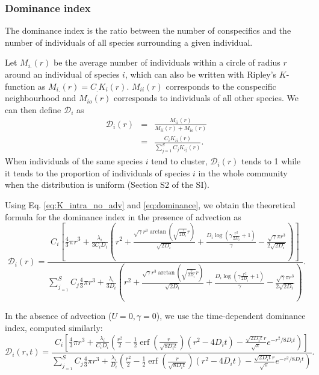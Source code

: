 \documentclass[english]{article}
\DeclareMathOperator\erf{erf}
\begin{document}
\subsubsection*{Dominance index}

The dominance index \citep[defined in Table S1 in the Supporting Information of][]{wiegand_how_2007}
is the ratio between the number of conspecifics and the number of
individuals of all species surrounding a given individual.

 Let $M_{i.}(r)$ be the average number of individuals within a circle
of radius $r$ around an individual of species $i$, which can also
be written with Ripley's $K$-function as $M_{i.}(r)=C_{.}K_{i}(r)$.
$M_{ii}(r)$ corresponds to the conspecific neighbourhood and $M_{io}(r)$
corresponds to individuals of all other species. We can then define
$\mathcal{D}_{i}$ as
\begin{equation}
\begin{array}{ccc}
\mathcal{D}_{i}(r) & = & \frac{M_{ii}(r)}{M_{ii}(r)+M_{io}(r)}\\
 & = & \frac{C_{i}K_{ii}(r)}{\sum_{j=1}^{S}C_{j}K_{ij}(r)}.
\end{array}\label{eq:dominance}
\end{equation}
When individuals of the same species $i$ tend to cluster, $\mathcal{D}_{i}(r)$
tends to 1 while it tends to the proportion of individuals of species
$i$ in the whole community when the distribution is uniform (Section
S2 of the SI).

Using Eq. \ref{eq:K_intra_no_adv} and \ref{eq:dominance}, we obtain
the theoretical formula for the dominance index in the presence of
advection as
\begin{equation}
\mathcal{D}_{i}(r)=\frac{C_{i}\left[\frac{4}{3}\pi r^{3}+\frac{\lambda_i}{3C_{i}D_i}\left(r^{2}+\frac{\sqrt{\gamma}r^{3}\arctan(\sqrt{\frac{\gamma}{2D_i}}r)}{\sqrt{2D_i}}+\frac{D_i\log\left(\gamma\frac{r^{2}}{2D_i}+1\right)}{\gamma}-\frac{\sqrt{\gamma}\pi r^{3}}{2\sqrt{2D_i}}\right)\right]}{\sum_{j_{=1}}^{S}C_{j}\frac{4}{3}\pi r^{3}+\frac{\lambda_i}{3D_i}\left(r^{2}+\frac{\sqrt{\gamma}r^{3}\arctan(\sqrt{\frac{\gamma}{2D_i}}r)}{\sqrt{2D_i}}+\frac{D_i\log\left(\gamma\frac{r^{2}}{2D_i}+1\right)}{\gamma}-\frac{\sqrt{\gamma}\pi r^{3}}{2\sqrt{2D_i}}\right)}.\label{eq:dom_adv}
\end{equation}

In the absence of advection ($U=0,\gamma=0$), we use the time-dependent
dominance index, computed similarly:
\begin{equation}
\mathcal{D}_{i}(r,t)=\frac{C_{i}\left[\frac{4}{3}\pi r^{3}+\frac{\lambda_i}{C_{i}D_i}\left(\frac{r^{2}}{2}-\frac{1}{2}\erf(\frac{r}{\sqrt{8D_i t}})(r^{2}-4D_i t)-\frac{\sqrt{2D_it}r}{\sqrt{\pi}}e^{-r^{2}/8D_i t}\right)\right]}{\sum_{j_{=1}}^{S}C_{j}\frac{4}{3}\pi r^{3}+\frac{\lambda_i}{D_i}\left(\frac{r^{2}}{2}-\frac{1}{2}\erf(\frac{r}{\sqrt{8D_i t}})(r^{2}-4D_i t)-\frac{\sqrt{2D_i t}r}{\sqrt{\pi}}e^{-r^{2}/8D_i t}\right)}.\label{eq:dom_noadv}
\end{equation}
\end{document}

